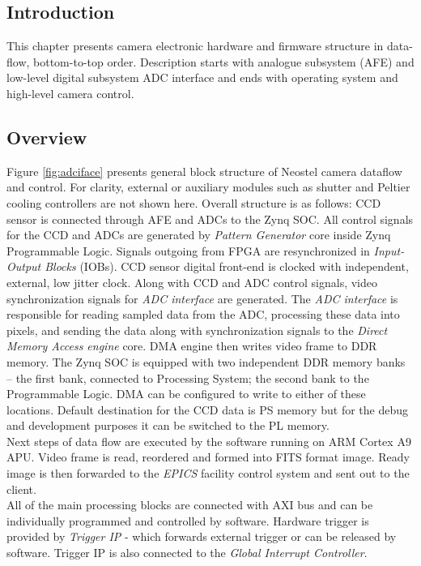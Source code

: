 \subsection{Introduction}
This chapter presents camera electronic hardware and firmware structure in data-flow, bottom-to-top order. 
Description starts with analogue subsystem (AFE) and low-level digital subsystem ADC interface and ends with operating system and high-level camera control.


\subsection{Overview}
Figure \ref{fig:adciface} presents general block structure of Neostel camera dataflow and control. For clarity, external or auxiliary modules such as shutter and Peltier cooling controllers are not shown here. Overall structure is as follows: CCD sensor is connected through AFE and ADCs to the Zynq SOC. All control signals for the CCD and ADCs are generated by \emph{Pattern Generator} core inside Zynq Programmable Logic. Signals outgoing from FPGA are resynchronized in \emph{Input-Output Blocks} (IOBs). CCD sensor digital front-end is clocked with independent, external, low jitter clock. Along with CCD and ADC control signals, video synchronization signals for \emph{ADC interface} are generated. The \emph{ADC interface} is responsible for reading sampled data from the ADC, processing these data into pixels, and sending the data along with synchronization signals to the \emph{Direct Memory Access engine} core. DMA engine then writes video frame to DDR memory. The Zynq SOC is equipped with two independent DDR memory banks – the first bank, connected to Processing System; the second bank to the Programmable Logic. DMA can be configured to write to either of these locations. Default destination for the CCD data is PS memory but for the debug and development purposes it can be switched to the PL memory. \\
Next steps of data flow are executed by the software running on ARM Cortex A9 APU. Video frame is read, reordered and formed into FITS format image. Ready image is then forwarded to the \emph{EPICS} facility control system and sent out to the client. \\
All of the main processing blocks are connected with AXI bus and can be individually programmed and controlled by software. Hardware trigger is provided by \emph{Trigger IP} - which forwards external trigger or can be released by software. Trigger IP is also connected to the \emph{Global Interrupt Controller}.


